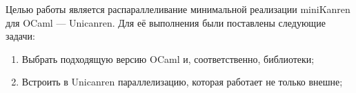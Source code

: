 
\label{sec:task}
 Целью работы является распараллеливание минимальной реализации miniKanren для OCaml --- Unicanren. Для её выполнения были поставлены следующие задачи:
 \begin{enumerate}
 \item  Выбрать подходящую версию OCaml и, соответственно, библиотеки;
 \item  Встроить в Unicanren параллелизацию, которая работает не только внешне;
\end{enumerate}
